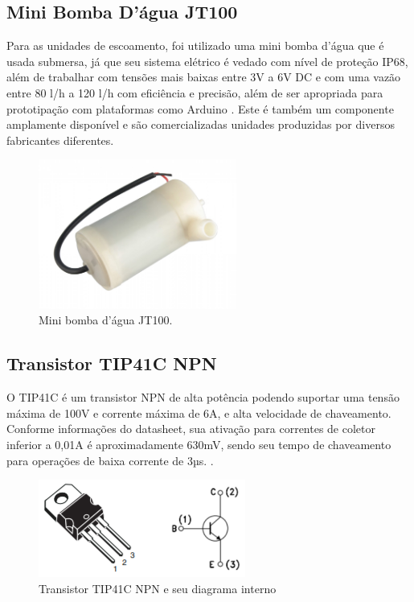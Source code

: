 \subsection{Mini Bomba D'água JT100}
Para as unidades de escoamento, foi utilizado uma mini bomba d’água que é usada submersa, já que seu sistema elétrico é vedado com nível de proteção IP68, além de trabalhar com tensões mais baixas entre 3V a 6V DC e com uma vazão entre 80 l/h a 120 l/h com eficiência e precisão, além de ser apropriada para prototipação com plataformas como Arduino \cite{usinainfo}. Este é também um componente amplamente disponível e são comercializadas unidades produzidas por diversos fabricantes diferentes.

\begin{figure}[ht]
    \centering
    \includegraphics[width=6.5cm]{imagem/jt100.jpg} 
    \caption{Mini bomba d'água JT100.}
    \label{fig:mini-water-pump}
\end{figure}

\subsection{Transistor TIP41C NPN}
O TIP41C é um transistor NPN de alta potência podendo suportar uma tensão máxima de 100V e corrente máxima de 6A, e alta velocidade de chaveamento. Conforme informações do datasheet, sua ativação para correntes de coletor inferior a 0,01A é aproximadamente 630mV, sendo seu tempo de chaveamento para operações de baixa corrente de 3µs. \cite{utmel}.

\begin{figure}[ht]
    \centering
    \includegraphics[width=6.8cm]{imagem/tip41c-w-schematic.png} 
    \caption{Transistor TIP41C NPN e seu diagrama interno}
    \label{fig:tip41c-npn}
\end{figure}

